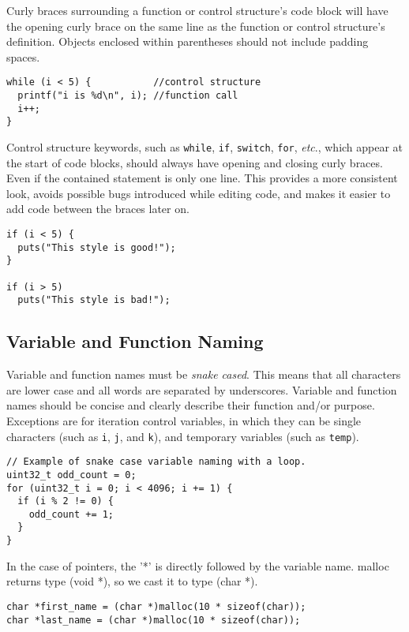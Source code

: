 \documentclass[11pt]{article}
\begin{document}
Curly braces surrounding a function or control structure's code block will have
the opening curly brace on the same line as the function or control structure's
definition. Objects enclosed within parentheses should not include padding spaces.

\begin{lstlisting}
while (i < 5) {           //control structure
  printf("i is %d\n", i); //function call
  i++;
}
\end{lstlisting}

Control structure keywords, such as \texttt{while}, \texttt{if}, \texttt{switch},
\texttt{for}, \emph{etc}., which appear at the start of code blocks, should always
have opening and closing curly braces. Even if the contained statement is only
one line. This provides a more consistent look, avoids possible bugs introduced
while editing code, and makes it easier to add code between the braces later on.

\begin{lstlisting}
if (i < 5) {
  puts("This style is good!");
}

if (i > 5)
  puts("This style is bad!");
\end{lstlisting}

\subsection{Variable and Function Naming}

Variable and function names must be \emph{snake cased}. This means that all
characters are lower case and all words are separated by underscores.
Variable and function names should be concise and clearly describe their
function and/or purpose. Exceptions are for iteration control variables, in which they can be
single characters (such as \texttt{i}, \texttt{j}, and \texttt{k}), and
temporary variables (such as \texttt{temp}).

\begin{lstlisting}
// Example of snake case variable naming with a loop.
uint32_t odd_count = 0;
for (uint32_t i = 0; i < 4096; i += 1) {
  if (i % 2 != 0) {
    odd_count += 1;
  }
}
\end{lstlisting}
In the case of pointers, the '*' is directly followed by the variable name.
malloc returns type (void *), so we cast it to type (char *).

\begin{lstlisting}
char *first_name = (char *)malloc(10 * sizeof(char));
char *last_name = (char *)malloc(10 * sizeof(char));
\end{lstlisting}
\end{document}

